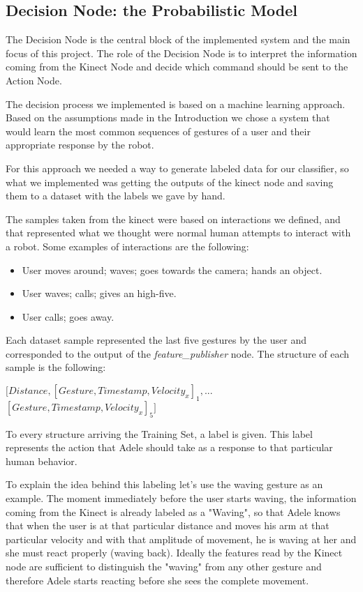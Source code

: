 \subsection{Decision Node: the Probabilistic Model}
The Decision Node is the central block of the implemented system and the main focus of this project. The role of the Decision Node is to interpret the information coming from the Kinect Node and decide which command should be sent to the Action Node.

The decision process we implemented is based on a machine learning approach. Based on the assumptions made in the Introduction we chose a system that would learn the most common sequences of gestures of a user and their appropriate response by the robot. 

For this approach we needed a way to generate labeled data for our classifier, so what we implemented was getting the outputs of the kinect node and saving them to a dataset with the labels we gave by hand.

The samples taken from the kinect were based on interactions we defined, and that represented what we thought were normal human attempts to interact with a robot. Some examples of interactions are the following:

\begin{itemize}
\item User moves around; waves; goes towards the camera; hands an object.
\item User waves; calls; gives an high-five.
\item User calls; goes away.
\end{itemize}

Each dataset sample represented the last five gestures by the user and corresponded to the output of the \textit{feature\_publisher} node. The structure of each sample is the following:

\vspace*{4pt}
$\big[Distance, [Gesture, Timestamp, Velocity_x]_1,...$\\$
[Gesture, Timestamp, Velocity_x]_5\big]$
\vspace*{4pt}

To every structure arriving the Training Set, a label is given. This label represents the action that Adele should take as a response to that particular human behavior.

To explain the idea behind this labeling let's use the waving gesture as an example. The moment immediately before the user starts waving, the information coming from the Kinect is already labeled as a "Waving", so that Adele knows that when the user is at that particular distance and moves his arm at that particular velocity and with that amplitude of movement, he is waving at her and she must react properly (waving back). Ideally the features read by the Kinect node are sufficient to distinguish the "waving" from any other gesture and therefore Adele starts reacting before she sees the complete movement.

